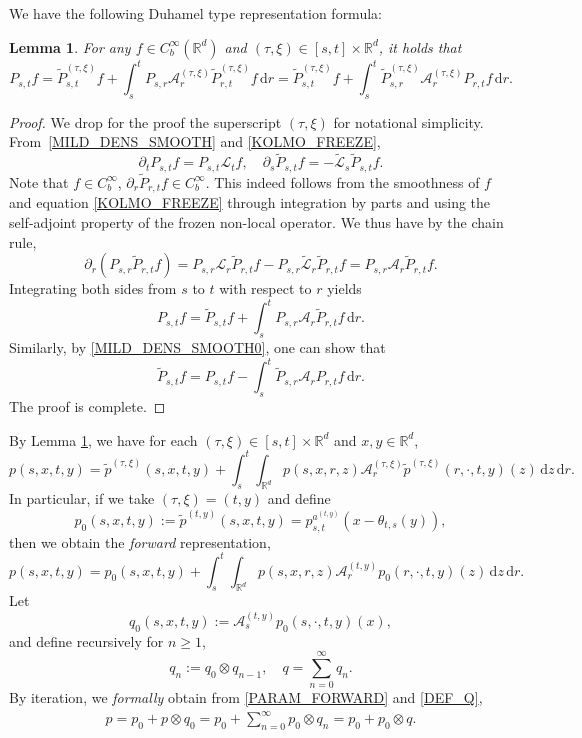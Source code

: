 \documentclass[JEP,XML,SOM,Unicode,published]{cedram}
\theoremstyle{plain}
\newtheorem{lemma}[theorem]{Lemma}
\theoremstyle{definition}
\let\p\partial
\let\wt\widetilde
\newcommand\mR{\mathbb{R}}
\newcommand\1{{\mathbf{1}}}
\newcommand\sA{{\mathscr A}}
\newcommand\sL{{\mathscr L}}
\newcommand{\dif}{\,\mathrm{d}}
\begin{document}
We have the following Duhamel type representation formula:
\begin{lemma}\label{Le310}
For any $f\in C_b^\infty(\mR^d)$ and $(\tau,\xi)\in[s,t]\times\mR^d$, it holds that
\[
P_{s,t}f=\widetilde P^{(\tau,\xi)}_{s,t}f+\int^t_sP_{s,r}\sA^{(\tau,\xi)}_r\widetilde P^{(\tau,\xi)}_{r,t}f\dif r
=\widetilde P^{(\tau,\xi)}_{s,t}f+\int^t_s\widetilde P^{(\tau,\xi)}_{s,r}\sA^{(\tau,\xi)}_rP_{r,t}f\dif r.
\]
\end{lemma}
\begin{proof}
We drop for the proof the superscript $(\tau,\xi)$ for notational simplicity. From~\eqref{MILD_DENS_SMOOTH} and \eqref{KOLMO_FREEZE},
\[
\p_t P_{s,t}f=P_{s,t}\sL_t f,\quad \p_s \widetilde P_{s,t}f=-\widetilde \sL_s\widetilde P_{s,t}f.
\]
Note that $f\in C_b^\infty$, $\partial_r \widetilde P_{r,t}f\in C^\infty_b$. {This indeed follows from the smoothness of $f$ and equation \eqref{KOLMO_FREEZE} through integration by parts and using the self-adjoint property of the frozen non-local operator}. We thus have by the chain rule,
\[
\p_r(P_{s,r}\widetilde P_{r,t}f)=P_{s,r}\sL_r\widetilde P_{r,t}f-P_{s,r}\wt\sL_r\widetilde P_{r,t}f
=P_{s,r}\sA_r\widetilde P_{r,t}f.
\]
Integrating both sides from $s$ to $t$ with respect to $r$ yields\vspace*{-3pt}
\[
P_{s,t}f=\widetilde P_{s,t}f+\int^t_sP_{s,r}\sA_r\widetilde P_{r,t}f\dif r.
\]
Similarly, by \eqref{MILD_DENS_SMOOTH0}, one can show that\vspace*{-3pt}
\[
\wt P_{s,t}f= P_{s,t}f-\int^t_s\widetilde P_{s,r}\sA_rP_{r,t}f\dif r.
\]
The proof is complete.
\end{proof}

By Lemma \ref{Le310}, we have for each $(\tau,\xi)\in[s,t]\times\mR^d$ and $x,y\in\mR^d$,
\[
p(s,x,t,y)
=\wt p^{(\tau,\xi)}(s,x,t,y)+
\int^t_s\int_{\mR^d}p(s,x,r,z)\sA^{(\tau,\xi)}_{r}\wt p^{(\tau,\xi)}(r,\cdot,t,y)(z)\dif z\dif r.
\]
In particular, if we take $(\tau,\xi)=(t,y)$ and define
\begin{equation}\label{Fre}
p_0(s,x,t,y):=\tilde p^{(t,y)}(s,x,t,y)= p_{{s,t}}^{a^{(t,y)}}(x-\theta_{t,s}(y)),
\end{equation}
then we obtain the {\it forward} representation,
\begin{equation}\label{PARAM_FORWARD}
p(s,x,t,y)
=p_0(s,x,t,y)+
\int^t_s\int_{\mR^d}p(s,x,r,z)\sA^{(t,y)}_{r}p_0(r,\cdot,t,y)(z)\dif z\dif r.
\end{equation}
Let\vspace*{-3pt}
\[
q_0(s,x,t,y):=\sA^{(t,y)}_{s}p_0(s,\cdot,t,y)(x),
\]
and define recursively for $n\ge 1 $,\vspace*{-3pt}
\begin{equation}\label{DEF_Q}
q_n:=q_0\otimes q_{n-1},\quad q=\sum_{n=0}^\infty q_n.
\end{equation}
By iteration, we \textit{formally} obtain from \eqref{PARAM_FORWARD} and \eqref{DEF_Q},
\begin{align}\label{Eq1}
p=p_0+p\otimes q_0=p_0+\sum_{n=0}^\infty p_0\otimes q_n=p_0+p_0\otimes q.
\end{align}
\end{document}
